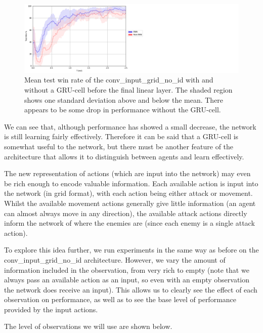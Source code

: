 \begin{figure}
    \centering
    \hbox{\hspace{5em}\includegraphics[scale=0.5]{images/graphs/rnn.png}}
    \caption{Mean test win rate of the conv\_input\_grid\_no\_id with and without a GRU-cell before the final linear layer. The shaded region shows one standard deviation above and below the mean. There appears to be some drop in performance without the GRU-cell.}
    \label{fig:rnnvsnonrnn}
\end{figure}


We can see that, although performance has showed a small decrease, the network is still learning fairly effectively. Therefore it can be said that a GRU-cell is somewhat useful to the network, but there must be another feature of the architecture that allows it to distinguish between agents and learn effectively. 

The new representation of actions (which are input into the network) may even be rich enough to encode valuable information. Each available action is input into the network (in grid format), with each action being either attack or movement. Whilst the available movement actions generally give little information (an agent can almost always move in any direction), the available attack actions directly inform the network of where the enemies are (since each enemy is a single attack action).


To explore this idea further, we run experiments in the same way as before on the conv\_input\_grid\_no\_id architecture. However, we vary the amount of information included in the observation, from very rich to empty (note that we always pass an available action as an input, so even with an empty observation the network does receive an input). This allows us to clearly see the effect of each observation on performance, as well as to see the base level of performance provided by the input actions.

The level of observations we will use are shown below.


